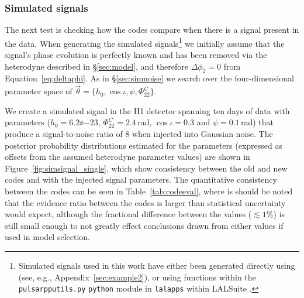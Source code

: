 \subsubsection{Simulated signals}\label{sec:simsignal}

The next test is checking how the codes compare when there is a signal present in the data. When generating the simulated signals\footnote{Simulated signals
used in this work have either been generated directly using \lppen (see, e.g., Appendix~\ref{sec:example2}), or using functions within the {\tt pulsarpputils.py} 
{\tt python} module in {\tt lalapps} within LALSuite \citep{lalsuite}.} we initially
assume that the signal's phase evolution is perfectly known and has been removed via the heterodyne described in \S\ref{sec:model}, and therefore
$\Delta\phi_2 = 0$ from Equation~\ref{eq:deltaphi}. As in \S\ref{sec:simnoise} we search over the four-dimensional parameter space of
$\vec{\theta} = \{h_0, \cos{\iota}, \psi, \Phi_{22}^C\}$.

We create a simulated signal in the H1 detector spanning ten days of data with parameters ($h_0 = 6.2\ee{-23}$, $\Phi_{22}^C = 2.4$\,rad, $\cos{\iota} = 0.3$
and $\psi = 0.1$\,rad) that produce a signal-to-noise ratio of 8 when injected into
Gaussian noise. The posterior probability distributions estimated for the parameters (expressed as offsets from the assumed heterodyne parameter values) are
shown in Figure~\ref{fig:simsignal_single}, which show consistency
between the old and new codes and with the injected signal parameters. The quantitative consistency between the codes can be seen in Table~\ref{tab:codeeval},
where is should be noted that the evidence ratio between the codes is larger than statistical uncertainty would expect, although the fractional difference between
the values ($\lesssim 1\%$) is still small enough to not greatly effect conclusions drawn from either values if used in model selection.

